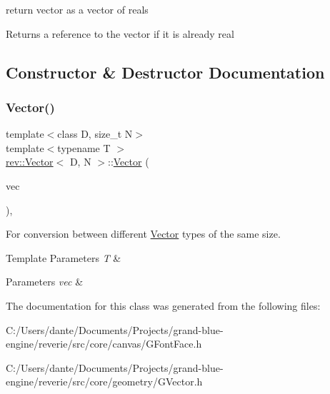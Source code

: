 return vector as a vector of reals 

Returns a reference to the vector if it is already real 

\subsection{Constructor \& Destructor Documentation}
\mbox{\label{classrev_1_1_vector_a622a7a8ae9b9a9fc7b87e662aadccecb}} 
\subsubsection{\texorpdfstring{Vector()}{Vector()}}
{\footnotesize\ttfamily template$<$class D, size\+\_\+t N$>$ \\
template$<$typename T $>$ \\
\mbox{\hyperlink{classrev_1_1_vector}{rev\+::\+Vector}}$<$ D, N $>$\+::\mbox{\hyperlink{classrev_1_1_vector}{Vector}} (\begin{DoxyParamCaption}\item[{const \mbox{\hyperlink{classrev_1_1_vector}{Vector}}$<$ T, N $>$ \&}]{vec }\end{DoxyParamCaption})\hspace{0.3cm}{\ttfamily [inline]}, {\ttfamily [explicit]}}



For conversion between different \mbox{\hyperlink{classrev_1_1_vector}{Vector}} types of the same size. 


\begin{DoxyTemplParams}{Template Parameters}
{\em T} & \\
\hline
\end{DoxyTemplParams}

\begin{DoxyParams}{Parameters}
{\em vec} & \\
\hline
\end{DoxyParams}


The documentation for this class was generated from the following files\+:\begin{DoxyCompactItemize}
\item 
C\+:/\+Users/dante/\+Documents/\+Projects/grand-\/blue-\/engine/reverie/src/core/canvas/G\+Font\+Face.\+h\item 
C\+:/\+Users/dante/\+Documents/\+Projects/grand-\/blue-\/engine/reverie/src/core/geometry/G\+Vector.\+h\end{DoxyCompactItemize}
